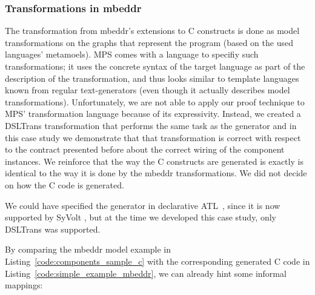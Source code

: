 \subsubsection{Transformations in mbeddr}

The transformation from mbeddr's extensions to C constructs is done as model
transformations on the graphs that represent the program (based on the used
languages' metamoels). MPS comes with a language to specifiy such
transformations; it uses the concrete syntax of the target language as part of
the description of the transformation, and thus looks similar to template
languages known from regular text-generators (even though it actually describes
model transformations). Unfortunately, we are not able to apply our proof
technique to MPS' transformation language because of its
expressivity. Instead, we created a DSLTrans transformation that performs the
same task as the generator and in this case study we demonstrate that that
transformation is correct with respect to the contract presented before about
the correct wiring of the component instances.
We reinforce that the way the C constructs are generated is exactly is
identical to the way it is done by the mbeddr transformations. 
We did not decide on how the C code is generated.

We could have specified the generator in declarative ATL~\cite{Jouault2006a},
since it is now supported by SyVolt \cite{Oakes}, but at the time we developed
this case study, only DSLTrans was supported.


By comparing the mbeddr model example in Listing~\ref{code:components_sample_c}
with the corresponding generated C code in
Listing~\ref{code:simple_example_mbeddr}, we can already hint some informal
mappings:

